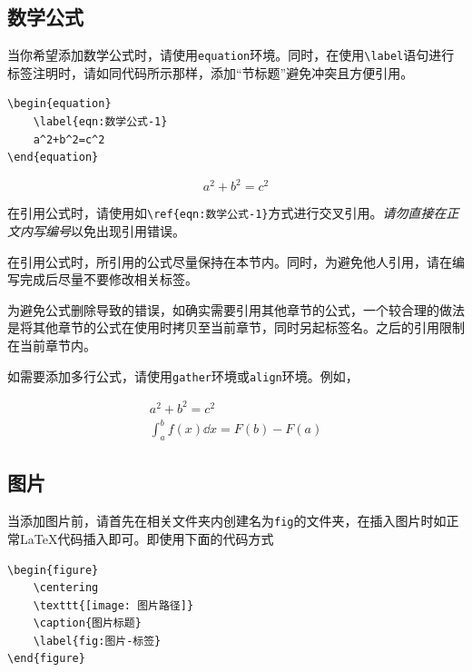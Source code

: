 \subsection{数学公式}\label{subsec:关于如何使用LaTeX编写模板-数学公式}

当你希望添加数学公式时，请使用\verb|equation|环境。同时，在使用\verb|\label|语句进行标签注明时，请如同代码所示那样，添加“节标题”避免冲突且方便引用。

\begin{lstlisting}[frame=line]
\begin{equation}
    \label{eqn:数学公式-1}
    a^2+b^2=c^2
\end{equation}
\end{lstlisting}

\begin{equation}
    \label{eqn:数学公式-1}
    a^2+b^2=c^2
\end{equation}

在引用公式时，请使用如\verb|\ref{eqn:数学公式-1}|方式进行交叉引用。\emph{请勿直接在正文内写编号}以免出现引用错误。

\begin{attention}
    在引用公式时，所引用的公式尽量保持在本节内。同时，为避免他人引用，请在编写完成后尽量不要修改相关标签。

    为避免公式删除导致的错误，如确实需要引用其他章节的公式，一个较合理的做法是将其他章节的公式在使用时拷贝至当前章节，同时另起标签名。之后的引用限制在当前章节内。
\end{attention}

如需要添加多行公式，请使用\verb|gather|环境或\verb|align|环境。例如，

\begin{gather}
    a^2+b^2=c^2\label{eqn:数学公式-2}\\
    \int_a^bf(x)\dd{x}=F(b)-F(a)\label{eqn:数学公式-3}
\end{gather}

\subsection{图片}\label{subsec:关于如何使用LaTeX编写模板-图片}

当添加图片前，请首先在相关文件夹内创建名为\verb|fig|的文件夹，在插入图片时如正常\LaTeX 代码插入即可。即使用下面的代码方式

\begin{lstlisting}[frame=line]
\begin{figure}
    \centering
    \texttt{[image: 图片路径]}
    \caption{图片标题}
    \label{fig:图片-标签}
\end{figure}
\end{lstlisting}

